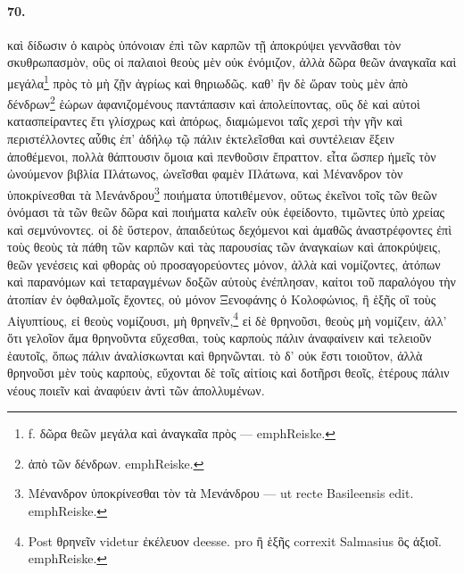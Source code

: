 \documentclass[a4paper, 11pt, oneside, polutonikogreek, german]{article}
\begin{document}
\paragraph{70.}
καὶ δίδωσιν ὁ καιρὸς ὑπόνοιαν ἐπὶ τῶν καρπῶν τῇ ἀποκρύψει γεννᾶσθαι τὸν σκυθρωπασμὸν, οὓς οἱ παλαιοὶ θεοὺς μὲν οὐκ ἐνόμιζον, ἀλλὰ δῶρα θεῶν ἀναγκαῖα καὶ μεγάλα\footnote{f. δῶρα θεῶν μεγάλα καὶ ἀναγκαῖα πρὸς --- emph{Reiske.}} πρὸς τὸ μὴ ζῇν ἀγρίως καὶ θηριωδῶς. καθ' ἣν δὲ ὥραν τοὺς μὲν ἀπὸ δένδρων\footnote{ἀπὸ τῶν δένδρων. emph{Reiske.}} ἑώρων ἀφανιζομένους παντάπασιν καὶ ἀπολείποντας, οὓς δὲ καὶ αὐτοὶ κατασπείραντες ἔτι γλίσχρως καὶ ἀπόρως, διαμώμενοι ταῖς χερσὶ τὴν γῆν καὶ περιστέλλοντες αὖθις ἐπ' ἀδήλῳ τῷ πάλιν ἐκτελεῖσθαι καὶ συντέλειαν ἕξειν ἀποθέμενοι, πολλὰ θάπτουσιν ὅμοια καὶ πενθοῦσιν ἔπραττον. εἶτα ὥσπερ ἡμεῖς τὸν ὠνούμενον βιβλία Πλάτωνος, ὠνεῖσθαι φαμὲν Πλάτωνα, καὶ Μένανδρον τὸν ὑποκρίνεσθαι τὰ Μενάνδρου\footnote{Μένανδρον ὑποκρίνεσθαι τὸν τὰ Μενάνδρου --- ut recte Basileensis edit. emph{Reiske.}} ποιήματα ὑποτιθέμενον, οὕτως ἐκεῖνοι τοῖς τῶν θεῶν ὀνόμασι τὰ τῶν θεῶν δῶρα καὶ ποιήματα καλεῖν οὐκ ἐφείδοντο, τιμῶντες ὑπὸ χρείας καὶ σεμνύνοντες. οἱ δὲ ὕστερον, ἀπαιδεύτως δεχόμενοι καὶ ἀμαθῶς ἀναστρέφοντες ἐπὶ τοὺς θεοὺς τὰ πάθη τῶν καρπῶν καὶ τὰς παρουσίας τῶν ἀναγκαίων καὶ ἀποκρύψεις, θεῶν γενέσεις καὶ φθορὰς οὐ προσαγορεύοντες μόνον, ἀλλὰ καὶ νομίζοντες, ἀτόπων καὶ παρανόμων καὶ τεταραγμένων δοξῶν αὑτοὺς ἐνέπλησαν, καίτοι τοῦ παραλόγου τὴν ἀτοπίαν ἐν ὀφθαλμοῖς ἔχοντες, οὐ μόνον Ξενοφάνης ὁ Κολοφώνιος, ἢ ἑξῆς οἳ τοὺς Αἰγυπτίους, εἰ θεοὺς νομίζουσι, μὴ θρηνεῖν,\footnote{Post θρηνεῖν videtur ἐκέλευον deesse. pro ἢ ἑξῆς correxit Salmasius ὃς ἀξιοῖ. emph{Reiske.}} εἰ δὲ θρηνοῦσι, θεοὺς μὴ νομίζειν, ἀλλ' ὅτι γελοῖον ἅμα θρηνοῦντα εὔχεσθαι, τοὺς καρποὺς πάλιν ἀναφαίνειν καὶ τελειοῦν ἑαυτοῖς, ὅπως πάλιν ἀναλίσκωνται καὶ θρηνῶνται. τὸ δ' οὐκ ἔστι τοιοῦτον, ἀλλὰ θρηνοῦσι μὲν τοὺς καρποὺς, εὔχονται δὲ τοῖς αἰτίοις καὶ δοτῆρσι θεοῖς, ἑτέρους πάλιν νέους ποιεῖν καὶ ἀναφύειν ἀντὶ τῶν ἀπολλυμένων.
\end{document}
